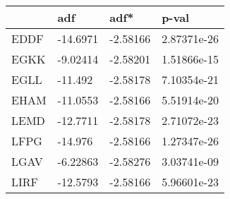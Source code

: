 \begin{tabular}{llll}
\toprule
{} &      adf &     adf* &        p-val \\
\midrule
EDDF & -14.6971 & -2.58166 &  2.87371e-26 \\
EGKK & -9.02414 & -2.58201 &  1.51866e-15 \\
EGLL &  -11.492 & -2.58178 &  7.10354e-21 \\
EHAM & -11.0553 & -2.58166 &  5.51914e-20 \\
LEMD & -12.7711 & -2.58178 &  2.71072e-23 \\
LFPG &  -14.976 & -2.58166 &  1.27347e-26 \\
LGAV & -6.22863 & -2.58276 &  3.03741e-09 \\
LIRF & -12.5793 & -2.58166 &  5.96601e-23 \\
\bottomrule
\end{tabular}
